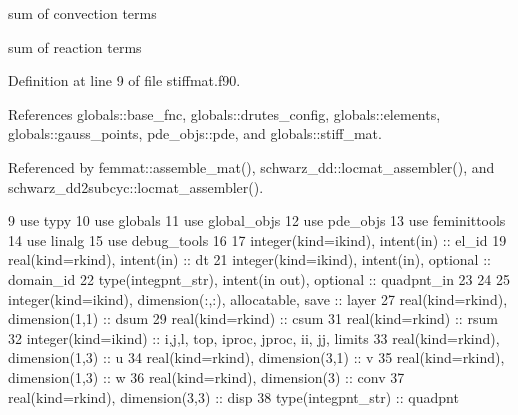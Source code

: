 sum of convection terms

sum of reaction terms 

Definition at line 9 of file stiffmat.\+f90.



References globals\+::base\+\_\+fnc, globals\+::drutes\+\_\+config, globals\+::elements, globals\+::gauss\+\_\+points, pde\+\_\+objs\+::pde, and globals\+::stiff\+\_\+mat.



Referenced by femmat\+::assemble\+\_\+mat(), schwarz\+\_\+dd\+::locmat\+\_\+assembler(), and schwarz\+\_\+dd2subcyc\+::locmat\+\_\+assembler().


\begin{DoxyCode}
9       \textcolor{keywordtype}{use }typy
10       \textcolor{keywordtype}{use }globals
11       \textcolor{keywordtype}{use }global_objs
12       \textcolor{keywordtype}{use }pde_objs
13       \textcolor{keywordtype}{use }feminittools
14       \textcolor{keywordtype}{use }linalg
15       \textcolor{keywordtype}{use }debug_tools
16 
17       \textcolor{keywordtype}{integer(kind=ikind)}, \textcolor{keywordtype}{intent(in)} :: el\_id
19       \textcolor{keywordtype}{real(kind=rkind)}, \textcolor{keywordtype}{intent(in)} :: dt
21       \textcolor{keywordtype}{integer(kind=ikind)}, \textcolor{keywordtype}{intent(in)}, \textcolor{keywordtype}{optional} :: domain\_id
22       \textcolor{keywordtype}{type}(integpnt_str), \textcolor{keywordtype}{intent(in out)}, \textcolor{keywordtype}{optional} :: quadpnt\_in
23 
24       
25       \textcolor{keywordtype}{integer(kind=ikind)}, \textcolor{keywordtype}{dimension(:,:)}, \textcolor{keywordtype}{allocatable}, \textcolor{keywordtype}{save} :: layer
27       \textcolor{keywordtype}{real(kind=rkind)}, \textcolor{keywordtype}{dimension(1,1)} :: dsum
29       \textcolor{keywordtype}{real(kind=rkind)} :: csum
31       \textcolor{keywordtype}{real(kind=rkind)} :: rsum
32       \textcolor{keywordtype}{integer(kind=ikind)} :: i,j,l, top, iproc, jproc, ii, jj, limits
33       \textcolor{keywordtype}{real(kind=rkind)}, \textcolor{keywordtype}{dimension(1,3)} :: u
34       \textcolor{keywordtype}{real(kind=rkind)}, \textcolor{keywordtype}{dimension(3,1)} :: v
35       \textcolor{keywordtype}{real(kind=rkind)}, \textcolor{keywordtype}{dimension(1,3)} :: w
36       \textcolor{keywordtype}{real(kind=rkind)}, \textcolor{keywordtype}{dimension(3)} :: conv
37       \textcolor{keywordtype}{real(kind=rkind)}, \textcolor{keywordtype}{dimension(3,3)} :: disp
38       \textcolor{keywordtype}{type}(integpnt_str) :: quadpnt

\end{DoxyCode}
